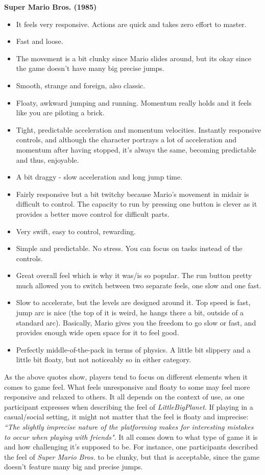 \textbf{Super Mario Bros. (1985)}
\vspace{-5mm}
\begin{itemize}[noitemsep,nolistsep]
\item It feels very responsive. Actions are quick and takes zero effort to master.
\item Fast and loose.
\item The movement is a bit clunky since Mario slides around, but its okay since the game doesn't have many big precise jumps.
\item Smooth, strange and foreign, also classic.
\item Floaty, awkward jumping and running. Momentum really holds and it feels like you are piloting a brick.
\item Tight, predictable acceleration and momentum velocities. Instantly responsive controls, and although the character portrays a lot of acceleration and momentum after having stopped, it's always the same, becoming predictable and thus, enjoyable.
\item A bit draggy - slow acceleration and long jump time.
\item Fairly responsive but a bit twitchy because Mario's movement in midair is difficult to control. The capacity to run by pressing one button is clever as it provides a better move control for difficult parts.
\item Very swift, easy to control, rewarding.
\item Simple and predictable. No stress. You can focus on tasks instead of the controls.
\item Great overall feel which is why it was/is so popular. The run button pretty much allowed you to switch between two separate feels, one slow and one fast.
\item Slow to accelerate, but the levels are designed around it. Top speed is fast, jump arc is nice (the top of it is weird, he hangs there a bit, outside of a standard arc). Basically, Mario gives you the freedom to go slow or fast, and provides enough wide open space for it to feel good.
\item Perfectly middle-of-the-pack in terms of physics. A little bit slippery and a little bit floaty, but not noticeably so in either category.
\end{itemize}

As the above quotes show, players tend to focus on different elements when it comes to game feel. What feels unresponsive and floaty to some may feel more responsive and relaxed to others. It all depends on the context of use, as one participant expresses when describing the feel of \textit{LittleBigPlanet}. If playing in a casual/social setting, it might not matter that the feel is floaty and imprecise: \textit{``The slightly imprecise nature of the platforming makes for interesting mistakes to occur when playing with friends"}. It all comes down to what type of game it is and how challenging it's supposed to be. For instance, one participants described the feel of \textit{Super Mario Bros.} to be clunky, but that is acceptable, since the game doesn't feature many big and precise jumps.

